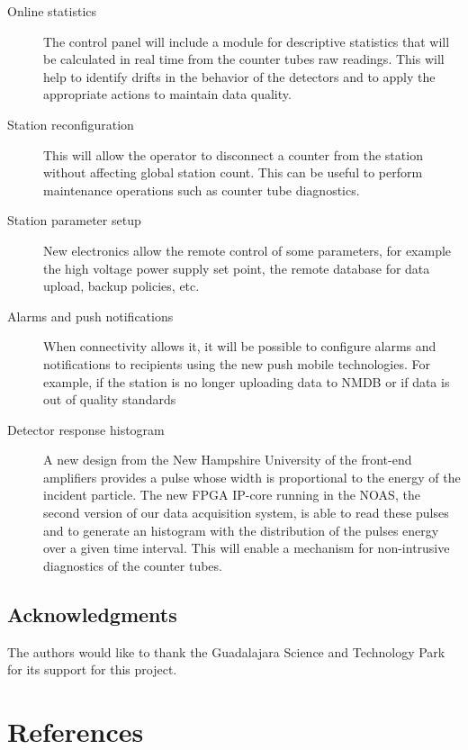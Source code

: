 \documentclass[a4paper]{jpconf}
\begin{document}
\begin{description}
    \item[Online statistics] The control panel will include a module for
        descriptive statistics that will be calculated in real time from the
        counter tubes raw readings. This will help to identify drifts in the
        behavior of the detectors and to apply the appropriate actions to
        maintain data quality.
    \item[Station reconfiguration] This will allow the operator to disconnect a
        counter from the station without affecting global station count. This
        can be useful to perform maintenance operations such as counter tube
        diagnostics. 
    \item[Station parameter setup] New electronics allow the remote control of
        some parameters, for example the high voltage power supply set point,
        the remote database for data upload, backup policies, etc.
    \item[Alarms and push notifications] When connectivity allows it, it will
        be possible to configure alarms and notifications to recipients using
        the new push mobile technologies. For example, if the station is no
        longer uploading data to NMDB or if data is out of quality standards
    \item[Detector response histogram] A new design from the New
        Hampshire University of the front-end amplifiers provides a pulse whose
        width is proportional to the energy of the incident particle. The new
        FPGA IP-core running in the NOAS, the second version of our data
        acquisition system, is able to read these pulses and to generate an
        histogram with the distribution of the pulses energy over a given time
        interval. This will enable a mechanism for non-intrusive diagnostics of
        the counter tubes. 
\end{description}


\subsection*{Acknowledgments} 

The authors would like to thank the Guadalajara Science and Technology Park for
its support for this project.


\section*{References}
 
\end{document}
